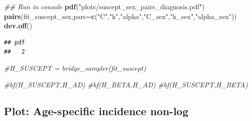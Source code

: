 \documentclass[
]{article}
\newenvironment{Shaded}{\begin{snugshade}}{\end{snugshade}}
\newcommand{\CommentTok}[1]{\textcolor[rgb]{0.56,0.35,0.01}{\textit{#1}}}
\newcommand{\DataTypeTok}[1]{\textcolor[rgb]{0.13,0.29,0.53}{#1}}
\newcommand{\KeywordTok}[1]{\textcolor[rgb]{0.13,0.29,0.53}{\textbf{#1}}}
\newcommand{\NormalTok}[1]{#1}
\newcommand{\StringTok}[1]{\textcolor[rgb]{0.31,0.60,0.02}{#1}}
\begin{document}
\begin{Shaded}
\begin{Highlighting}[]
\CommentTok{## Run in console}
\KeywordTok{pdf}\NormalTok{(}\StringTok{"plots/suscept_sex_pairs_diagnosis.pdf"}\NormalTok{)}
\KeywordTok{pairs}\NormalTok{(fit_suscept_sex,}\DataTypeTok{pars=}\KeywordTok{c}\NormalTok{(}\StringTok{"C"}\NormalTok{,}\StringTok{"k"}\NormalTok{,}\StringTok{"alpha"}\NormalTok{,}\StringTok{"C_sex"}\NormalTok{,}\StringTok{"k_sex"}\NormalTok{,}\StringTok{"alpha_sex"}\NormalTok{))}
\KeywordTok{dev.off}\NormalTok{()}
\end{Highlighting}
\end{Shaded}

\begin{verbatim}
## pdf 
##   2
\end{verbatim}

\begin{Shaded}
\begin{Highlighting}[]
\CommentTok{#H_SUSCEPT = bridge_sampler(fit_suscept)}

\CommentTok{#bf(H_SUSCEPT,H_AD)}
\CommentTok{#bf(H_BETA,H_AD)}
\CommentTok{#bf(H_SUSCEPT,H_BETA)}
\end{Highlighting}
\end{Shaded}

\hypertarget{plot-age-specific-incidence-non-log}{%
\subsection{Plot: Age-specific incidence
non-log}\label{plot-age-specific-incidence-non-log}}
\end{document}
